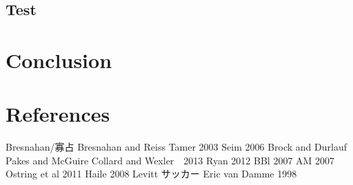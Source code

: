 \documentclass{jsarticle}
\begin{document}
\subsection{Test}


\section{Conclusion}

\section{References}
\begin{thebibliography}{10}
	 Bresnahan/寡占
	 Bresnahan and Reiss
	 Tamer 2003
	 Seim 2006
	 Brock and Durlauf
	 Pakes and McGuire
	 Collard and Wexler　2013
	 Ryan 2012
	 BBl 2007
	 AM 2007
	 Ostring et al 2011
	 Haile 2008
	 Levitt サッカー
	 Eric van Damme 1998
\end{thebibliography}
\end{document}
